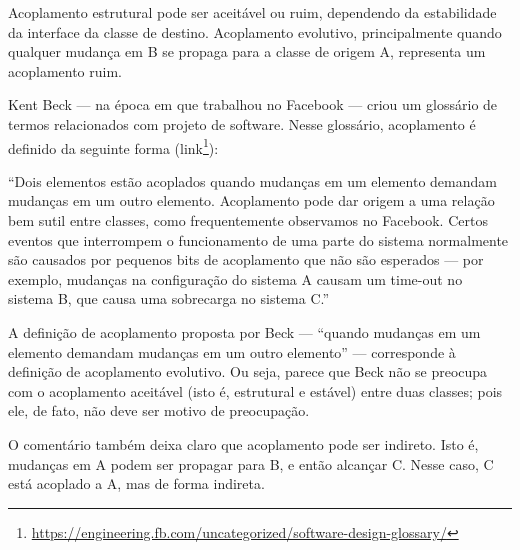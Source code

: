 \documentclass[
  11pt,
  twoside]{book}
\DeclareRobustCommand{\href}[2]{#2\footnote{\url{#1}}}
\renewenvironment{quote}{\centering \vspace{1.5ex} \begin{tcolorbox}[colback=backcolor, width=4.9in]}{\end{tcolorbox}}
\begin{document}
Acoplamento estrutural pode ser aceitável ou ruim, dependendo da
estabilidade da interface da classe de destino. Acoplamento evolutivo,
principalmente quando qualquer mudança em B se propaga para a classe de
origem A, representa um acoplamento ruim.

  Kent Beck --- na época em que
trabalhou no Facebook --- criou um glossário de termos relacionados com
projeto de software. Nesse glossário, acoplamento é definido da seguinte
forma
(\href{https://engineering.fb.com/uncategorized/software-design-glossary/}{link}):

\begin{quote}
``Dois elementos estão acoplados quando mudanças em um elemento demandam
mudanças em um outro elemento. Acoplamento pode dar origem a uma relação
bem sutil entre classes, como frequentemente observamos no Facebook.
Certos eventos que interrompem o funcionamento de uma parte do sistema
normalmente são causados por pequenos bits de acoplamento que não são
esperados --- por exemplo, mudanças na configuração do sistema A causam
um time-out no sistema B, que causa uma sobrecarga no sistema C.''
\end{quote}

A definição de acoplamento proposta por Beck --- ``quando mudanças em um
elemento demandam mudanças em um outro elemento'' --- corresponde à
definição de acoplamento evolutivo. Ou seja, parece que Beck não se
preocupa com o acoplamento aceitável (isto é, estrutural e estável)
entre duas classes; pois ele, de fato, não deve ser motivo de
preocupação.

O comentário também deixa claro que acoplamento pode ser indireto. Isto
é, mudanças em A podem ser propagar para B, e então alcançar C. Nesse
caso, C está acoplado a A, mas de forma indireta.

 
\end{document}
